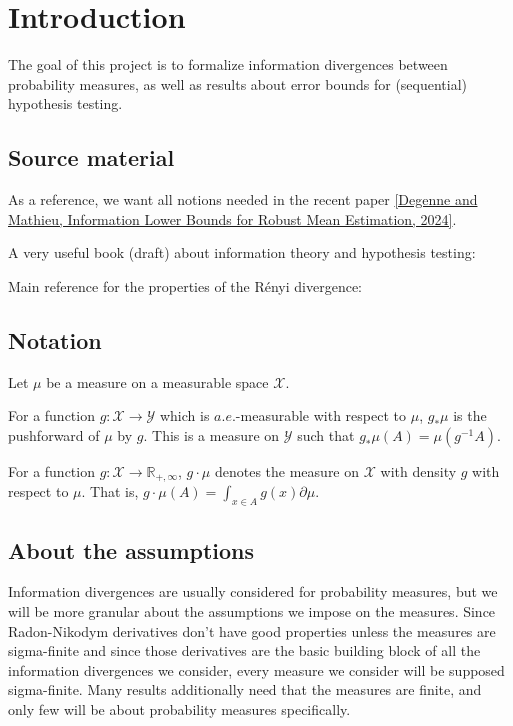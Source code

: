 \chapter*{Introduction}

The goal of this project is to formalize information divergences between probability measures, as well as results about error bounds for (sequential) hypothesis testing.

\section*{Source material}

As a reference, we want all notions needed in the recent paper \href{https://arxiv.org/abs/2403.01892}{[Degenne and Mathieu, Information Lower Bounds for Robust Mean Estimation, 2024]}.

A very useful book (draft) about information theory and hypothesis testing: \cite{polyanskiy2024information} 

Main reference for the properties of the Rényi divergence: \cite{van2014renyi}

\section*{Notation}

Let $\mu$ be a measure on a measurable space $\mathcal X$.

For a function $g : \mathcal X \to \mathcal Y$ which is $a.e.$-measurable with respect to $\mu$, $g_* \mu$ is the pushforward of $\mu$ by $g$. This is a measure on $\mathcal Y$ such that $g_* \mu (A) = \mu(g^{-1} A)$.

For a function $g : \mathcal X \to \mathbb{R}_{+,\infty}$, $g \cdot \mu$ denotes the measure on $\mathcal X$ with density $g$ with respect to $\mu$. That is, $g \cdot \mu (A) = \int_{x \in A} g(x) \partial\mu$.

\section*{About the assumptions}

Information divergences are usually considered for probability measures, but we will be more granular about the assumptions we impose on the measures.
Since Radon-Nikodym derivatives don't have good properties unless the measures are sigma-finite and since those derivatives are the basic building block of all the information divergences we consider, every measure we consider will be supposed sigma-finite.
Many results additionally need that the measures are finite, and only few will be about probability measures specifically.

